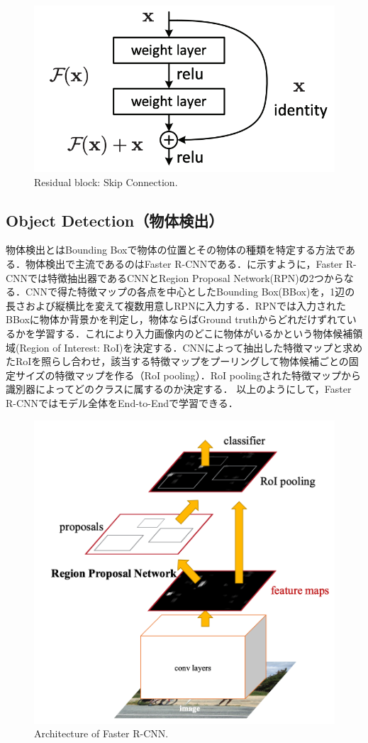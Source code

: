 \begin{figure}
    \centering
    \includegraphics[width=0.5\linewidth]{figure/chapter2/skipconnection}
    \caption[Residual block: Skip Connection. ]{Residual block: Skip Connection\cite{ResNet}. }
    \label{fig:skipconnection}
\end{figure}



\subsection{Object Detection（物体検出）}
物体検出とはBounding Boxで物体の位置とその物体の種類を特定する方法である．物体検出で主流であるのはFaster R-CNNである\cite{fasterRCNN}．に示すように，Faster R-CNNでは特徴抽出器であるCNNとRegion Proposal Network(RPN)の2つからなる．CNNで得た特徴マップの各点を中心としたBounding Box(BBox)を，1辺の長さおよび縦横比を変えて複数用意しRPNに入力する．RPNでは入力されたBBoxに物体か背景かを判定し，物体ならばGround truthからどれだけずれているかを学習する．これにより入力画像内のどこに物体がいるかという物体候補領域(Region of Interest: RoI)を決定する．CNNによって抽出した特徴マップと求めたRoIを照らし合わせ，該当する特徴マップをプーリングして物体候補ごとの固定サイズの特徴マップを作る（RoI pooling）．RoI poolingされた特徴マップから識別器によってどのクラスに属するのか決定する．
以上のようにして，Faster R-CNNではモデル全体をEnd-to-Endで学習できる．

\begin{figure}[H]
    \centering
    \includegraphics[width=0.7\linewidth]{figure/chapter2/fasterr-cnn}
    \caption[Architecture of Faster R-CNN.]{Architecture of Faster R-CNN\cite{fasterRCNN}.}
    \label{fig:fasterRCNN}
\end{figure}


